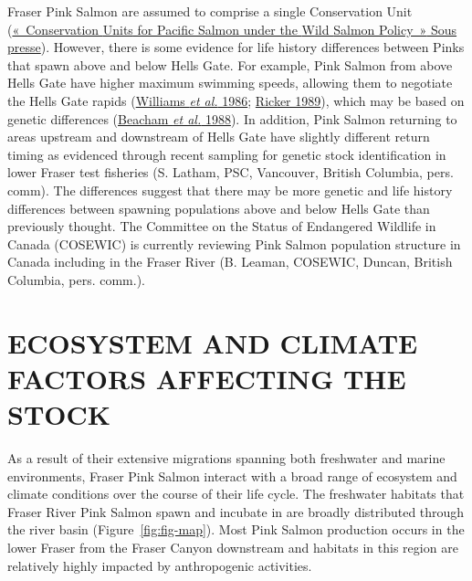 \documentclass[french,11pt]{book}
\begin{document}
Fraser Pink Salmon are assumed to comprise a single Conservation Unit (\protect\hyperlink{ref-holtbyConservationUnitsPacific2008}{{«~Conservation {Units} for {Pacific Salmon} under the {W}ild {S}almon {P}olicy~»} Sous presse}). However, there is some evidence for life history differences between Pinks that spawn above and below Hells Gate. For example, Pink Salmon from above Hells Gate have higher maximum swimming speeds, allowing them to negotiate the Hells Gate rapids (\protect\hyperlink{ref-williams1983EarlyRun1986}{Williams \emph{et al.} 1986}; \protect\hyperlink{ref-rickerHistoryPresentState1989}{Ricker 1989}), which may be based on genetic differences (\protect\hyperlink{ref-beachamVariationBodySize1988}{Beacham \emph{et al.} 1988}). In addition, Pink Salmon returning to areas upstream and downstream of Hells Gate have slightly different return timing as evidenced through recent sampling for genetic stock identification in lower Fraser test fisheries (S. Latham, PSC, Vancouver, British Columbia, pers. comm). The differences suggest that there may be more genetic and life history differences between spawning populations above and below Hells Gate than previously thought. The Committee on the Status of Endangered Wildlife in Canada (COSEWIC) is currently reviewing Pink Salmon population structure in Canada including in the Fraser River (B. Leaman, COSEWIC, Duncan, British Columbia, pers. comm.).

\hypertarget{ecosystem-and-climate-factors-affecting-the-stock}{%
\section{ECOSYSTEM AND CLIMATE FACTORS AFFECTING THE STOCK}\label{ecosystem-and-climate-factors-affecting-the-stock}}

As a result of their extensive migrations spanning both freshwater and marine environments, Fraser Pink Salmon interact with a broad range of ecosystem and climate conditions over the course of their life cycle. The freshwater habitats that Fraser River Pink Salmon spawn and incubate in are broadly distributed through the river basin (Figure~\ref{fig:fig-map}). Most Pink Salmon production occurs in the lower Fraser from the Fraser Canyon downstream and habitats in this region are relatively highly impacted by anthropogenic activities.
\end{document}
